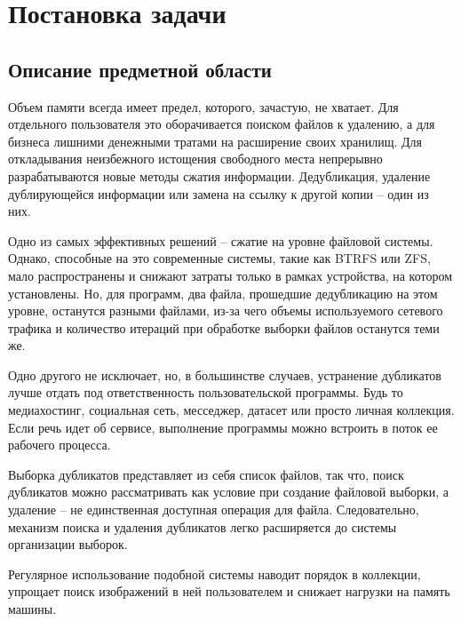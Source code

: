 \documentclass[variant=courcework]{bsuir}
\begin{document}
\chapter{Постановка задачи}

\section{Описание предметной области}

Объем памяти всегда имеет предел, которого, зачастую, не хватает. Для отдельного
пользователя это оборачивается поиском файлов к удалению, а для бизнеса лишними
денежными тратами на расширение своих хранилищ. Для откладывания неизбежного
истощения свободного места непрерывно разрабатываются новые методы сжатия
информации. Дедубликация, удаление дублирующейся информации или замена на ссылку
к другой копии -- один из них.

Одно из самых эффективных решений -- сжатие на уровне файловой системы. Однако,
способные на это современные системы, такие как BTRFS или ZFS, мало
распространены и снижают затраты только в рамках устройства, на котором
установлены. Но, для программ, два файла, прошедшие дедубликацию на этом уровне,
останутся разными файлами, из-за чего объемы используемого сетевого трафика и
количество итераций при обработке выборки файлов останутся теми же.

Одно другого не исключает, но, в большинстве случаев, устранение дубликатов
лучше отдать под ответственность пользовательской программы. Будь то
медиахостинг, социальная сеть, месседжер, датасет или просто личная коллекция.
Если речь идет об сервисе, выполнение программы можно встроить в поток ее
рабочего процесса.

Выборка дубликатов представляет из себя список файлов, так что, поиск дубликатов
можно рассматривать как условие при создание файловой выборки, а удаление -- не
единственная доступная операция для файла. Следовательно, механизм поиска и
удаления дубликатов легко расширяется до системы организации выборок.

Регулярное использование подобной системы наводит порядок в коллекции, упрощает
поиск изображений в ней пользователем и снижает нагрузки на память машины.

\end{document}
